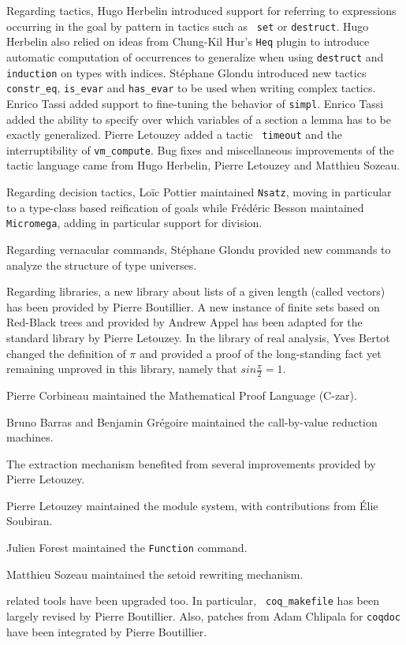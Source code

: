 Regarding tactics, Hugo Herbelin introduced support for referring to
expressions occurring in the goal by pattern in tactics such as {\tt
  set} or {\tt destruct}. Hugo Herbelin also relied on ideas from
Chung-Kil Hur's {\tt Heq} plugin to introduce automatic computation of
occurrences to generalize when using {\tt destruct} and {\tt
  induction} on types with indices.  St\'ephane Glondu introduced new
tactics {\tt constr\_eq}, {\tt is\_evar} and {\tt has\_evar} to be
used when writing complex tactics.  Enrico Tassi added support to
fine-tuning the behavior of {\tt simpl}. Enrico Tassi added the
ability to specify over which variables of a section a lemma has
to be exactly generalized.  Pierre Letouzey added a tactic {\tt
  timeout} and the interruptibility of {\tt vm\_compute}.  Bug fixes
and miscellaneous improvements of the tactic language came from Hugo
Herbelin, Pierre Letouzey and Matthieu Sozeau.

Regarding decision tactics, Lo\"ic Pottier maintained {\tt Nsatz},
moving in particular to a type-class based reification of goals while
Fr\'ed\'eric Besson maintained {\tt Micromega}, adding in particular
support for division.

Regarding vernacular commands, St\'ephane Glondu provided new commands
to analyze the structure of type universes.

Regarding libraries, a new library about lists of a given length
(called vectors) has been provided by Pierre Boutillier. A new
instance of finite sets based on Red-Black trees and provided by
Andrew Appel has been adapted for the standard library by Pierre
Letouzey. In the library of real analysis, Yves Bertot changed the
definition of $\pi$ and provided a proof of the long-standing fact yet
remaining unproved in this library, namely that $sin \frac{\pi}{2} =
1$.

Pierre Corbineau maintained the Mathematical Proof Language (C-zar).

Bruno Barras and Benjamin Gr\'egoire maintained the call-by-value
reduction machines.

The extraction mechanism benefited from several improvements provided by
Pierre Letouzey.

Pierre Letouzey maintained the module system, with contributions from
\'Elie Soubiran.

Julien Forest maintained the {\tt Function} command.

Matthieu Sozeau maintained the setoid rewriting mechanism.

{\Coq} related tools have been upgraded too. In particular, {\tt
  coq\_makefile} has been largely revised by Pierre Boutillier. Also,
patches from Adam Chlipala for {\tt coqdoc} have been integrated by
Pierre Boutillier.

